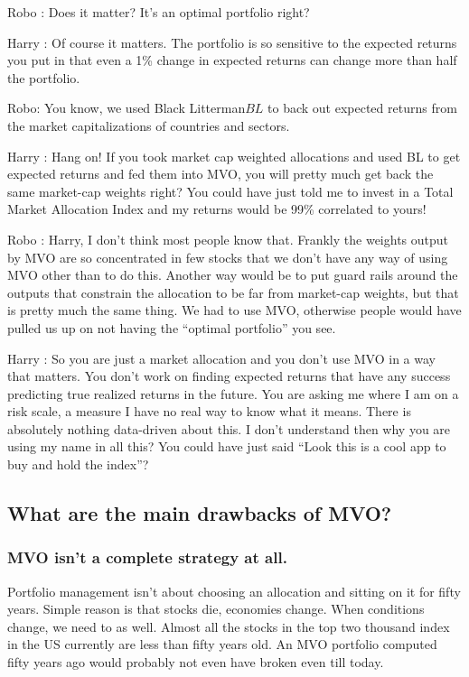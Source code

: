 \documentclass[a4paper]{article}
\begin{document}
Robo : Does it matter? It’s an optimal portfolio right?


Harry : Of course it matters. The portfolio is so sensitive to the expected returns you put in that even a 1\% change in expected returns can change more than half the portfolio.


Robo: You know, we used Black Litterman\(BL\)\cite{helitterman2002} to back out expected returns from the market capitalizations of countries and sectors.


Harry : Hang on! If you took market cap weighted allocations and used BL to get expected returns and fed them into MVO, you will pretty much get back the same market-cap weights right? You could have just told me to invest in a Total Market Allocation Index and my returns would be 99\% correlated to yours!


Robo : Harry, I don’t think most people know that. Frankly the weights output by MVO are so concentrated in few stocks that we don’t have any way of using MVO other than to do this. Another way would be to put guard rails around the outputs that constrain the allocation to be far from market-cap weights, but that is pretty much the same thing. We had to use MVO, otherwise people would have pulled us up on not having the “optimal portfolio” you see. 


Harry : So you are just a market allocation and you don’t use MVO in a way that matters. You don’t work on finding expected returns that have any success predicting true realized returns in the future. You are asking me where I am on a risk scale, a measure I have no real way to know what it means. There is absolutely nothing data-driven about this. I don’t understand then why you are using my name in all this? You could have just said “Look this is a cool app to buy and hold the index”?
\subsection{ What are the main drawbacks of MVO? \label{itemized-drawbacks}}
\subsubsection{ MVO isn’t a complete strategy at all. }
Portfolio management isn’t about choosing an allocation and sitting on it for fifty years. Simple reason is that stocks die, economies change. When conditions change, we need to as well. Almost all the stocks in the top two thousand index in the US currently are less than fifty years old. An MVO portfolio computed fifty years ago would probably not even have broken even till today.
 
\end{document}
